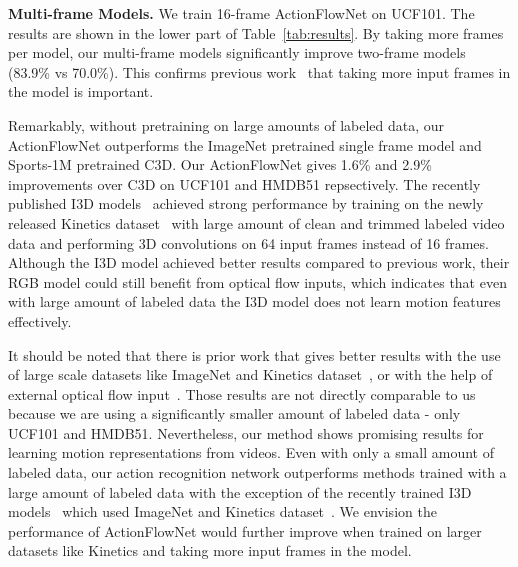 \documentclass[10pt,twocolumn,letterpaper]{article}
\begin{document}
\textbf{Multi-frame Models.}
We train 16-frame ActionFlowNet on UCF101. The results are shown in the lower part of Table~\ref{tab:results}. By taking more frames per model, our multi-frame models significantly improve two-frame models (83.9\% vs 70.0\%). This confirms previous work~\cite{karpathyTSLSF14,ngHVVMT15} that taking more input frames in the model is important.

Remarkably, without pretraining on large amounts of labeled data, our ActionFlowNet outperforms the ImageNet pretrained single frame model and Sports-1M pretrained C3D. Our ActionFlowNet gives 1.6\% and 2.9\% improvements over C3D on UCF101 and HMDB51 repsectively. 
The recently published I3D models~\cite{carreira2017quo} achieved strong performance by training on the newly released Kinetics dataset~\cite{kay2017kinetics} with large amount of clean and trimmed labeled video data and performing 3D convolutions on 64 input frames instead of 16 frames.
Although the I3D model achieved better results compared to previous work, their RGB model could still benefit from optical flow inputs, which indicates that even with large amount of labeled data the I3D model does not learn motion features effectively.

It should be noted that there is prior work that gives better results with the use of large scale datasets like ImageNet and Kinetics dataset~\cite{carreira2017quo}, or with the help of external optical flow input~\cite{simonyanZ14a}. Those results are not directly comparable to us because we are using a significantly smaller amount of labeled data - only UCF101 and HMDB51.
Nevertheless, our method shows promising results for learning motion representations from videos. Even with only a small amount of labeled data, our action recognition network outperforms methods trained with a large amount of labeled data with the exception of the recently trained I3D models~\cite{carreira2017quo} which used ImageNet and Kinetics dataset~\cite{kay2017kinetics}.
We envision the performance of ActionFlowNet would further improve when trained on larger datasets like Kinetics and taking more input frames in the model. 
\end{document}
